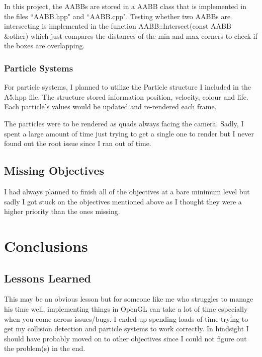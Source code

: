 \documentclass {article}
\begin{document}
In this project, the AABBs are stored in a AABB class that is implemented in the files ``AABB.hpp" and ``AABB.cpp". Testing whether two AABBs are intersecting is implemented in the function AABB::Intersect(const AABB \&other) which just compares the distances of the min and max corners to check if the boxes are overlapping.

\subsubsection{Particle Systems}
\hspace{0.5cm}For particle systems, I planned to utilize the Particle structure I included in the A5.hpp file. The structure stored information position, velocity, colour and life. Each particle's values would be updated and re-rendered each frame.

The particles were to be rendered as quads always facing the camera. Sadly, I spent a large amount of time just trying to get a single one to render but I never found out the root issue since I ran out of time.


\subsection{Missing Objectives}
\hspace{0.5cm}I had always planned to finish all of the objectives at a bare minimum level but sadly I got stuck on the objectives mentioned above as I thought they were a higher priority than the ones missing.



\newpage
\section{Conclusions}
\subsection{Lessons Learned}
\hspace{0.5cm}This may be an obvious lesson but for someone like me who struggles to manage his time well, implementing things in OpenGL can take a lot of time especially when you come across issues/bugs. I ended up spending loads of time trying to get my collision detection and particle systems to work correctly. In hindsight I should have probably moved on to other objectives since I could not figure out the problem(s) in the end.
\end{document}

